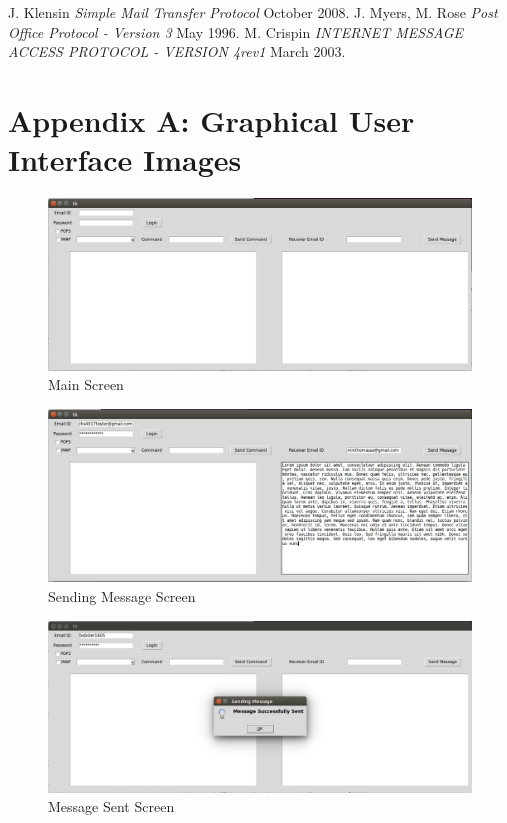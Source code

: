 \documentclass[11pt]{article}
\begin{document}
\begin{thebibliography}{9}
  J. Klensin {\em Simple Mail Transfer Protocol
}  October 2008.
  J. Myers, M. Rose {\em Post Office Protocol - Version 3
}  May 1996.
 M. Crispin {\em INTERNET MESSAGE ACCESS PROTOCOL - VERSION 4rev1
}   March 2003.
\end{thebibliography}
\newpage
\appendix
\section{Appendix A: Graphical User Interface Images}
\begin{figure}[h]
\centering
\caption{Main Screen}
\includegraphics[scale=0.7]{images/MainSCreen.png}
\end{figure}

\begin{figure}[h]
\centering
\caption{Sending Message Screen}
\includegraphics[scale=0.7]{images/sendingMessage.png}
\end{figure}

\begin{figure}[h]
\centering
\caption{Message Sent Screen}
\includegraphics[scale=0.7]{images/messageSent.png}
\end{figure}
\end{document}
